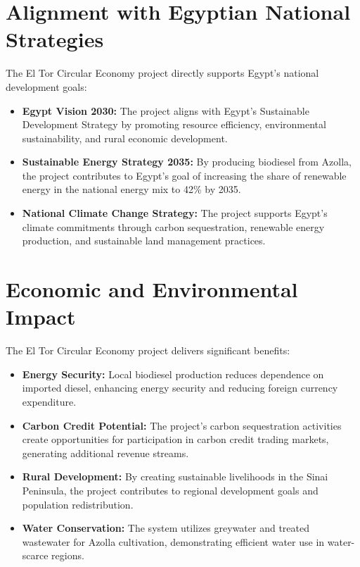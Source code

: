 \section{Alignment with Egyptian National Strategies}

The El Tor Circular Economy project directly supports Egypt's national development goals:

\begin{itemize}
    \item \textbf{Egypt Vision 2030:} The project aligns with Egypt's Sustainable Development Strategy by promoting resource efficiency, environmental sustainability, and rural economic development.
    
    \item \textbf{Sustainable Energy Strategy 2035:} By producing biodiesel from Azolla, the project contributes to Egypt's goal of increasing the share of renewable energy in the national energy mix to 42\% by 2035.
    
    \item \textbf{National Climate Change Strategy:} The project supports Egypt's climate commitments through carbon sequestration, renewable energy production, and sustainable land management practices.
\end{itemize}

\section{Economic and Environmental Impact}

The El Tor Circular Economy project delivers significant benefits:

\begin{itemize}
    \item \textbf{Energy Security:} Local biodiesel production reduces dependence on imported diesel, enhancing energy security and reducing foreign currency expenditure.
    
    \item \textbf{Carbon Credit Potential:} The project's carbon sequestration activities create opportunities for participation in carbon credit trading markets, generating additional revenue streams.
    
    \item \textbf{Rural Development:} By creating sustainable livelihoods in the Sinai Peninsula, the project contributes to regional development goals and population redistribution.
    
    \item \textbf{Water Conservation:} The system utilizes greywater and treated wastewater for Azolla cultivation, demonstrating efficient water use in water-scarce regions.
\end{itemize}

